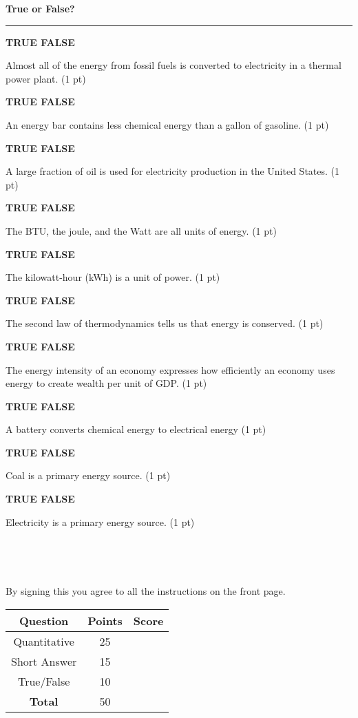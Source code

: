 \documentclass[12pt, oneside]{article}
\newif\ifsolution
\newcommand{\tf}[1]
{
\vfill
\parbox[t]{0.25\textwidth}{\bf TRUE \hspace{0.1 in} FALSE }
\parbox[t]{0.75\textwidth}{#1 (1 pt)}
}
\newcommand{\tablerow}[2]
{\rule[-0.3cm]{0cm}{1cm}#1 & #2 & \\ \hline}
\newcommand{\chead}[1]
{\begin{center}\large\textbf{#1}\end{center}
\hrule
\vspace{10pt}}
\newcommand{\solution}[1]
{\ifsolution
Answer: {\it #1}
\else\fi}
\begin{document}
\vfill


\newpage
\chead{True or False?}

%
\tf{Almost all of the energy from fossil fuels is converted to
electricity in a thermal power plant.}
\solution{False}

\tf{An energy bar contains less chemical energy than a gallon of
gasoline.}
\solution{True}

\tf{A large fraction of oil is used for electricity production in the
United States.}
\solution{False}

\tf{The BTU, the joule, and the Watt are all units of energy.}
\solution{False}

\tf{The kilowatt-hour (kWh) is a unit of power.}
\solution{False}

\tf{The second law of thermodynamics tells us that energy is conserved.}
\solution{False}

\tf{The energy intensity of an economy expresses how efficiently an
economy uses energy to create wealth per unit of GDP.}
\solution{True}

%
\tf{A battery converts chemical energy to electrical energy}
\solution{True}

\tf{Coal is a primary energy source.}
\solution{True}

\tf{Electricity is a primary energy source.}
\solution{False}


\newpage

\framebox[4.5in]{\rule{0cm}{1.5cm}}\\
\vspace{0.2cm}

\framebox[4.5in]{\rule{0cm}{1.5cm}}\\
\vspace{0.8cm}

By signing this you agree to all the instructions on the front page.

\vfill

\begin{center}
\begin{tabular}{|c|c|c|}
\hline
\rule[-0.3cm]{0cm}{1cm}
Question & Points & Score \\
\hline
\tablerow{Quantitative}{25}
\tablerow{Short Answer}{15}
\tablerow{True/False}{10}
\tablerow{\bf{Total}}{50}
\end{tabular}
\end{center}
\end{document}
